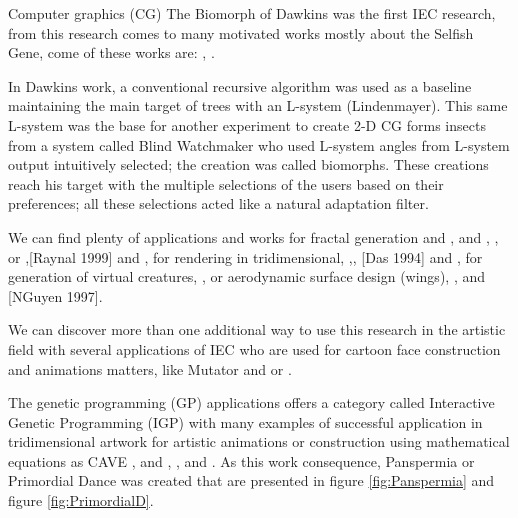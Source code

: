 


Computer graphics (CG) The Biomorph of Dawkins was the first IEC research, from
this research comes to many motivated works mostly about the Selfish Gene, come
of these works are:  \cite{ochoa1998genetic},
\cite{mccormack1993interactive}.

In Dawkins work, a conventional recursive algorithm was used as a baseline
maintaining the main target of trees with an L-system (Lindenmayer). This same
L-system was the base for another experiment to create 2-D CG forms insects from
a system called Blind Watchmaker who used L-system angles from L-system output
intuitively selected; the creation was called biomorphs. These creations reach
his target with the multiple selections of the users based on their preferences;
all these selections acted like a natural adaptation filter.

We can find plenty of applications and works for fractal generation and \cite{sims1992interactive}, \cite{baluja1993simulating} and \cite{baluja1994towards}, \cite{lund1995artistic}, or \cite{angeline1996evolving},\cite{raynal1999manipulation}[Raynal 1999] and
\cite{lutton2003artie}, for rendering in tridimensional,
\cite{todd1992artificial},\cite{broughton1997use},
\cite{das1994genetic}[Das 1994] and \cite{tam2002genetic}, for
generation of virtual creatures,
\cite{rowland2000evolutionary}, or aerodynamic surface design
(wings), \cite{nguyen1993evolvable},
\cite{nguyen1994evolvable} and \cite{}[NGuyen 1997].

We can discover more than one additional way to use this research in the
artistic field with several applications of IEC who are used for cartoon face
construction and animations matters, like Mutator \cite{todd1994evolutionary}
and \cite{todd1999mutation} or \cite{bentley1999introduction}.

The genetic programming (GP) applications offers a category called Interactive
Genetic Programming (IGP) with many examples of successful application in
tridimensional artwork for artistic animations or construction using
mathematical equations as CAVE \cite{das1994genetic},
\cite{papka1996ubiworld} and \cite{disz1997ubiworld},
\cite{sims1991artificial},
\cite{sims1992interactive} and \cite{min2004creative}. As
this work consequence, Panspermia or Primordial Dance was created that are
presented in figure \ref{fig:Panspermia} and figure \ref{fig:PrimordialD}.

